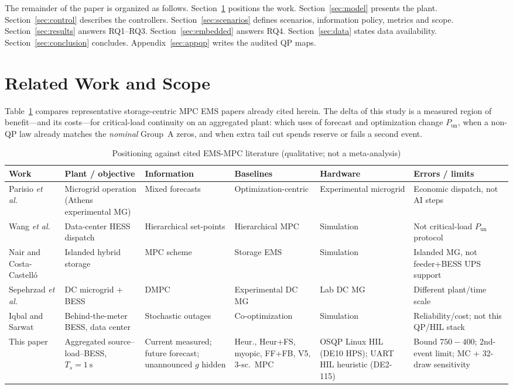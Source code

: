 \documentclass{ieeeaccess}
\begin{document}
The remainder of the paper is organized as follows. Section~\ref{sec:related} positions the work. Section~\ref{sec:model} presents the plant. Section~\ref{sec:control} describes the controllers. Section~\ref{sec:scenarios} defines scenarios, information policy, metrics and scope. Section~\ref{sec:results} answers RQ1--RQ3. Section~\ref{sec:embedded} answers RQ4. Section~\ref{sec:data} states data availability. Section~\ref{sec:conclusion} concludes. Appendix~\ref{sec:appqp} writes the audited QP maps.

\section{Related Work and Scope}
\label{sec:related}

Table~\ref{tab:lit} compares representative storage-centric MPC EMS papers already cited herein. The delta of this study is a measured region of benefit---and its costs---for critical-load continuity on an aggregated plant: which uses of forecast and optimization change $P_{\mathrm{un}}$, when a non-QP law already matches the \emph{nominal} Group~A zeros, and when extra tail cut spends reserve or fails a second event.

\begin{table}[!t]
\centering
\caption{Positioning against cited EMS-MPC literature (qualitative; not a meta-analysis)}
\label{tab:lit}
{\scriptsize\setlength{\tabcolsep}{3pt}%
\begin{tabular}{@{}lp{2.4cm}p{2.2cm}p{2.0cm}p{2.4cm}p{2.6cm}@{}}
\toprule
Work & Plant / objective & Information & Baselines & Hardware & Errors / limits \\
\midrule
Parisio \emph{et al.}~\cite{parisio2014mpc} & Microgrid operation (Athens experimental MG) & Mixed forecasts & Optimization-centric & Experimental microgrid & Economic dispatch, not AI steps \\
Wang \emph{et al.}~\cite{wang2023hierarchical} & Data-center HESS dispatch & Hierarchical set-points & Hierarchical MPC & Simulation & Not critical-load $P_{\mathrm{un}}$ protocol \\
Nair and Costa-Castell{\'o}~\cite{nair2020mpc} & Islanded hybrid storage & MPC scheme & Storage EMS & Simulation & Islanded MG, not feeder+BESS UPS support \\
Sepehrzad \emph{et al.}~\cite{sepehrzad2023mpc} & DC microgrid + BESS & DMPC & Experimental DC MG & Lab DC MG & Different plant/time scale \\
Iqbal and Sarwat~\cite{iqbal2026reliability} & Behind-the-meter BESS, data center & Stochastic outages & Co-optimization & Simulation & Reliability/cost; not this QP/HIL stack \\
This paper & Aggregated source--load--BESS, $T_s=\SI{1}{\second}$ & Current measured; future forecast; unannounced $g$ hidden & Heur., Heur+FS, myopic, FF+FB, V5, 3-sc.\ MPC & OSQP Linux HIL (DE10 HPS); UART HIL heuristic (DE2-115) & Bound $750{-}400$; 2nd-event limit; MC + 32-draw sensitivity \\
\bottomrule
\end{tabular}}
\end{table}
\end{document}
